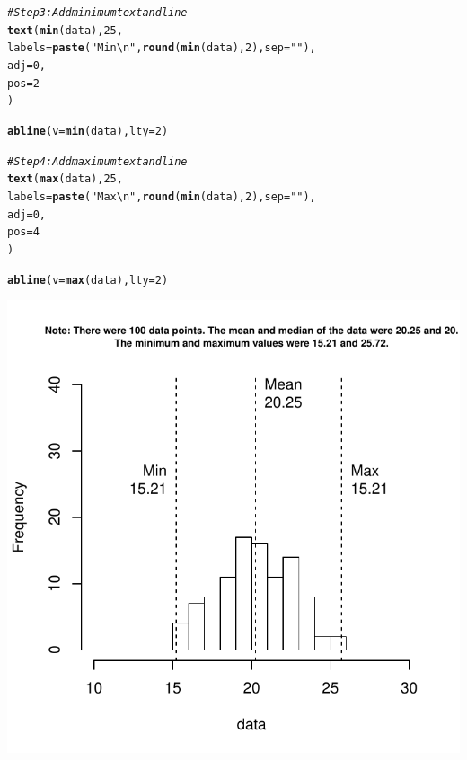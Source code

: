 \documentclass{tufte-book}\usepackage[]{graphicx}\usepackage[]{color}
\makeatletter
\def\maxwidth{ %
  \ifdim\Gin@nat@width>\linewidth
    \linewidth
  \else
    \Gin@nat@width
  \fi
}
\newcommand{\hlnum}[1]{\textcolor[rgb]{0.686,0.059,0.569}{#1}}%
\newcommand{\hlstr}[1]{\textcolor[rgb]{0.192,0.494,0.8}{#1}}%
\newcommand{\hlcom}[1]{\textcolor[rgb]{0.678,0.584,0.686}{\textit{#1}}}%
\newcommand{\hlstd}[1]{\textcolor[rgb]{0.345,0.345,0.345}{#1}}%
\newcommand{\hlkwc}[1]{\textcolor[rgb]{0.333,0.667,0.333}{#1}}%
\newcommand{\hlkwd}[1]{\textcolor[rgb]{0.737,0.353,0.396}{\textbf{#1}}}%
\newenvironment{kframe}{%
 \def\at@end@of@kframe{}%
 \ifinner\ifhmode%
  \def\at@end@of@kframe{\end{minipage}}%
  \begin{minipage}{\columnwidth}%
 \fi\fi%
 \def\FrameCommand##1{\hskip\@totalleftmargin \hskip-\fboxsep
 \colorbox{shadecolor}{##1}\hskip-\fboxsep
     \hskip-\linewidth \hskip-\@totalleftmargin \hskip\columnwidth}%
 \MakeFramed {\advance\hsize-\width
   \@totalleftmargin\z@ \linewidth\hsize
   \@setminipage}}%
 {\par\unskip\endMakeFramed%
 \at@end@of@kframe}
\newenvironment{knitrout}{}{} %
\makeatother
\begin{document}
\begin{footnotesize}
\begin{knitrout}
\begin{kframe}
\begin{alltt}
\hlcom{# Step 3: Add minimum text and line}
\hlkwd{text}\hlstd{(}\hlkwd{min}\hlstd{(data),} \hlnum{25}\hlstd{,}
     \hlkwc{labels} \hlstd{=} \hlkwd{paste}\hlstd{(}\hlstr{"Min\textbackslash{}n"}\hlstd{,} \hlkwd{round}\hlstd{(}\hlkwd{min}\hlstd{(data),} \hlnum{2}\hlstd{),} \hlkwc{sep} \hlstd{=} \hlstr{""}\hlstd{),}
     \hlkwc{adj} \hlstd{=} \hlnum{0}\hlstd{,}
     \hlkwc{pos} \hlstd{=} \hlnum{2}
\hlstd{)}

\hlkwd{abline}\hlstd{(}\hlkwc{v} \hlstd{=} \hlkwd{min}\hlstd{(data),} \hlkwc{lty} \hlstd{=} \hlnum{2}\hlstd{)}

\hlcom{# Step 4: Add maximum text and line}
\hlkwd{text}\hlstd{(}\hlkwd{max}\hlstd{(data),} \hlnum{25}\hlstd{,}
     \hlkwc{labels} \hlstd{=} \hlkwd{paste}\hlstd{(}\hlstr{"Max\textbackslash{}n"}\hlstd{,} \hlkwd{round}\hlstd{(}\hlkwd{min}\hlstd{(data),} \hlnum{2}\hlstd{),} \hlkwc{sep} \hlstd{=} \hlstr{""}\hlstd{),}
     \hlkwc{adj} \hlstd{=} \hlnum{0}\hlstd{,}
     \hlkwc{pos} \hlstd{=} \hlnum{4}
\hlstd{)}

\hlkwd{abline}\hlstd{(}\hlkwc{v} \hlstd{=} \hlkwd{max}\hlstd{(data),} \hlkwc{lty} \hlstd{=} \hlnum{2}\hlstd{)}
\end{alltt}
\end{kframe}
\includegraphics[width=\maxwidth]{figure/unnamed-chunk-224-1} 

\end{knitrout}
\end{footnotesize}
\end{document}
